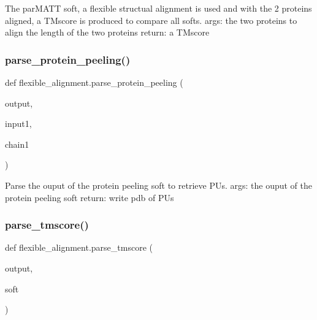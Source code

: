 \begin{DoxyVerb}The parMATT soft, a flexible structual alignment is used and with the
2 proteins aligned, a TMscore is produced to compare all softs.
args:
    the two proteins to align
    the length of the two proteins
return:
    a TMscore
\end{DoxyVerb}
 \mbox{\label{namespaceflexible__alignment_a0f14ab2865be6c5a6cc5a3f688b0d137}} 
\subsubsection{\texorpdfstring{parse\+\_\+protein\+\_\+peeling()}{parse\_protein\_peeling()}}
{\footnotesize\ttfamily def flexible\+\_\+alignment.\+parse\+\_\+protein\+\_\+peeling (\begin{DoxyParamCaption}\item[{}]{output,  }\item[{}]{input1,  }\item[{}]{chain1 }\end{DoxyParamCaption})}

\begin{DoxyVerb}Parse the ouput of the protein peeling soft to retrieve PUs.
args:
    the ouput of the protein peeling soft
return:
    write pdb of PUs
\end{DoxyVerb}
 \mbox{\label{namespaceflexible__alignment_a35eb5e0fce983b349c6011a86a655eda}} 
\subsubsection{\texorpdfstring{parse\+\_\+tmscore()}{parse\_tmscore()}}
{\footnotesize\ttfamily def flexible\+\_\+alignment.\+parse\+\_\+tmscore (\begin{DoxyParamCaption}\item[{}]{output,  }\item[{}]{soft }\end{DoxyParamCaption})}

